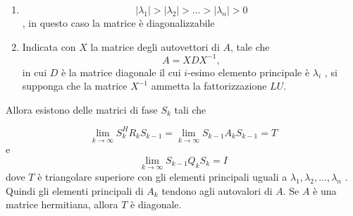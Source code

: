 \begin{theo}[Convergenza]
\begin{enumerate}
\item $$ | \lambda_1| > | \lambda_2 | > \ldots > | \lambda_n | > 0 $$,
in questo caso la matrice \`e diagonalizzabile
\item
Indicata con $X$ la matrice degli autovettori di $A$, tale che
\begin{equation}
 \label{eigenvalues:19}
A = XDX ^{-1} ,
\end{equation}
in cui $D$ \`e la matrice diagonale il cui $i$-esimo elemento principale \`e $\lambda_i$ ,
si supponga che la matrice $X^{-1}$ ammetta la fattorizzazione $LU$.
\end{enumerate}
 Allora
esistono delle matrici di fase $S_k$ tali che

\begin{equation}
 \label{eigenvalues:20}
\lim_{k \to \infty} S_k^{H} R_k S_{k-1} = \lim_{k \to \infty} S_{k-1} A_k S_{k-1} =T
\end{equation}
e
$$\lim_{k \to \infty} S_{k-1} Q_k S_k = I$$
dove $T$ \`e triangolare superiore con gli elementi principali uguali a
$\lambda_1 , \lambda_2 , \ldots,  \lambda_n$ .
 Quindi gli elementi principali di $A_k$ tendono agli autovalori di $A$. Se $A$
\`e una matrice hermitiana, allora $T$ \`e diagonale.
\end{theo}
